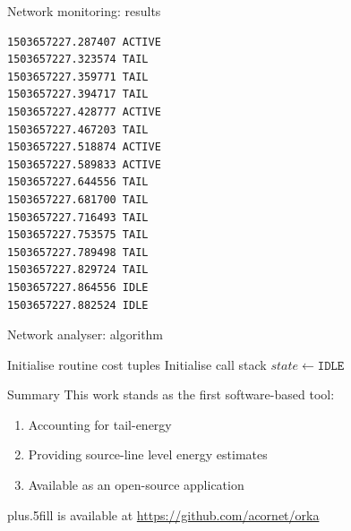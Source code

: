 %
%
\begin{frame}[fragile]{Network monitoring: results}
\begin{lstlisting}
1503657227.287407 ACTIVE
1503657227.323574 TAIL
1503657227.359771 TAIL
1503657227.394717 TAIL
1503657227.428777 ACTIVE
1503657227.467203 TAIL
1503657227.518874 ACTIVE
1503657227.589833 ACTIVE
1503657227.644556 TAIL
1503657227.681700 TAIL
1503657227.716493 TAIL
1503657227.753575 TAIL
1503657227.789498 TAIL
1503657227.829724 TAIL
1503657227.864556 IDLE
1503657227.882524 IDLE
\end{lstlisting}
\end{frame}
%
%
\begin{frame}{Network analyser: algorithm}
\begin{small}
\begin{algorithm}[H]
Initialise routine cost tuples\;
Initialise call stack\;
$state \leftarrow \texttt{IDLE}$\;
\end{algorithm}
\end{small}
\end{frame}
%
%
\begin{frame}{Summary}
This work stands as the first software-based tool:
\begin{enumerate}
\item Accounting for \alert{tail-energy}
\item Providing \alert{source-line level} energy estimates
\item Available as an \alert{open-source} application
\end{enumerate}
\vskip0pt plus.5fill
{\small \orka{} is available at \url{https://github.com/acornet/orka}}
\end{frame}
%
%

